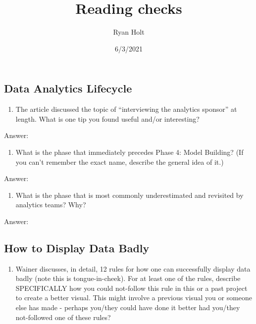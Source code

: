 \documentclass[
]{article}
\title{Reading checks}
\author{Ryan Holt}
\date{6/3/2021}
\providecommand{\tightlist}{%
  \setlength{\itemsep}{0pt}\setlength{\parskip}{0pt}}
\begin{document}
\maketitle

\hypertarget{data-analytics-lifecycle}{%
\subsection{Data Analytics Lifecycle}\label{data-analytics-lifecycle}}

\begin{enumerate}
\def\labelenumi{\arabic{enumi}.}
\tightlist
\item
  The article discussed the topic of ``interviewing the analytics
  sponsor'' at length. What is one tip you found useful and/or
  interesting?
\end{enumerate}

Answer:

\begin{enumerate}
\def\labelenumi{\arabic{enumi}.}
\setcounter{enumi}{1}
\tightlist
\item
  What is the phase that immediately precedes Phase 4: Model Building?
  (If you can't remember the exact name, describe the general idea of
  it.)
\end{enumerate}

Answer:

\begin{enumerate}
\def\labelenumi{\arabic{enumi}.}
\setcounter{enumi}{2}
\tightlist
\item
  What is the phase that is most commonly underestimated and revisited
  by analytics teams? Why?
\end{enumerate}

Answer:

\hypertarget{how-to-display-data-badly}{%
\subsection{How to Display Data Badly}\label{how-to-display-data-badly}}

\begin{enumerate}
\def\labelenumi{\arabic{enumi}.}
\tightlist
\item
  Wainer discusses, in detail, 12 rules for how one can successfully
  display data badly (note this is tongue-in-cheek). For at least one of
  the rules, describe SPECIFICALLY how you could not-follow this rule in
  this or a past project to create a better visual. This might involve a
  previous visual you or someone else has made - perhaps you/they could
  have done it better had you/they not-followed one of these rules?
\end{enumerate}
\end{document}
